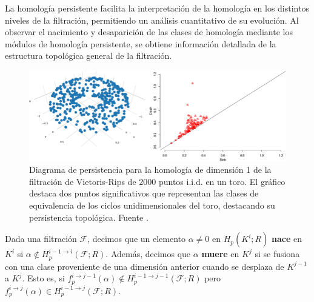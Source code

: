 La homología persistente facilita la interpretación de la homología en los distintos
niveles de la filtración, permitiendo un análisis cuantitativo de su evolución. Al
observar el nacimiento y desaparición de las clases de homología mediante los módulos
de homología persistente, se obtiene información detallada de la estructura
topológica general de la filtración.

\begin{figure}[h]
	\centering
	\includegraphics[width=\textwidth]{img/persistence-diagram.png}
	\caption{Diagrama de persistencia para la homología de dimensión 1 de la
		filtración de Vietoris-Rips de 2000 puntos i.i.d. en un toro. El gráfico
		destaca dos puntos significativos que representan las clases de equivalencia
		de los ciclos unidimensionales del toro, destacando su persistencia topológica.
		Fuente \cite{divol2019}.}
\end{figure}

\begin{definicion}
	Dada una filtración $\mathcal{F}$, decimos que un elemento $\alpha \neq 0$ en
	$H_{p}(K^{i};R)$ \textbf{nace} en $K^{i}$ si $\alpha \not\in H_{p}^{i-1 \to i}(
	\mathcal{F};R)$. Además, decimos que $\alpha$ \textbf{muere} en $K^{j}$ si se
	fusiona con una clase proveniente de una dimensión anterior cuando se desplaza
	de $K^{j-1}$ a $K^{j}$. Esto es, si
	$f^{i \to j-1}_{p}(\alpha) \not\in H_{p}^{i-1 \to j-1}(\mathcal{F};R)$ pero
	$f^{i \to j}_{p}(\alpha) \in H_{p}^{i-1 \to j}(\mathcal{F};R)$.
\end{definicion}

